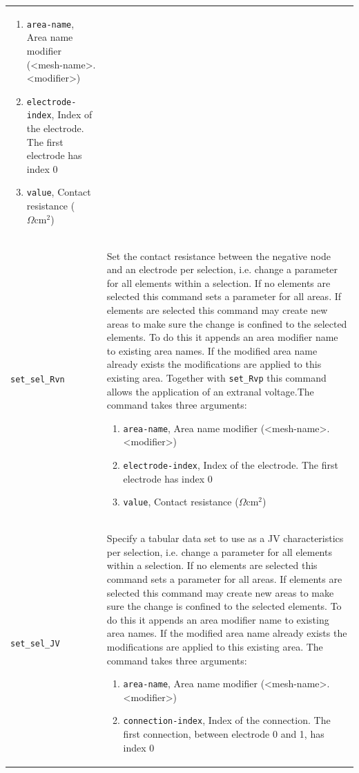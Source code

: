\documentclass[noshowpacs,preprintnumbers,amsmath,amssymb, letter]{revtex4}
\begin{document}
\begin{longtable}{p{}p{}}
\begin{enumerate}
\item \texttt{area-name}, Area name modifier (\textless mesh-name\textgreater .\textless modifier\textgreater )
\item \texttt{electrode-index}, Index of the electrode. The first electrode has index 0
\item \texttt{value}, Contact resistance ($\Omega \text{cm}^2$)
\end{enumerate}\\
\texttt{set\_sel\_Rvn}	&  Set the contact resistance between the negative node and an electrode per selection, i.e. change a parameter for all elements within a selection. If no elements are selected this command sets a parameter for all areas. If elements are selected this command may create new areas to make sure the change is confined to the selected elements. To do this it appends an area modifier name to existing area names. If the modified area name already exists the modifications are applied to this existing area. Together with \texttt{set\_Rvp} this command allows the application of an extranal voltage.The command takes three arguments:
\begin{enumerate}
\item \texttt{area-name}, Area name modifier (\textless mesh-name\textgreater .\textless modifier\textgreater )
\item \texttt{electrode-index}, Index of the electrode. The first electrode has index 0
\item \texttt{value}, Contact resistance ($\Omega \text{cm}^2$)
\end{enumerate}\\
\texttt{set\_sel\_JV}	&  Specify a tabular data set to use as a JV characteristics per selection, i.e. change a parameter for all elements within a selection. If no elements are selected this command sets a parameter for all areas. If elements are selected this command may create new areas to make sure the change is confined to the selected elements. To do this it appends an area modifier name to existing area names. If the modified area name already exists the modifications are applied to this existing area. The command takes three arguments:
\begin{enumerate}
\item \texttt{area-name}, Area name modifier (\textless mesh-name\textgreater .\textless modifier\textgreater )
\item \texttt{connection-index}, Index of the connection. The first connection, between electrode 0 and 1,  has index 0

\end{enumerate}
\end{longtable}
\end{document}

